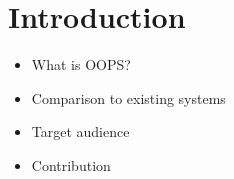\section{Introduction}

\begin{itemize}
\item{What is OOPS?}
\item{Comparison to existing systems}
\item{Target audience}
\item{Contribution}
\end{itemize}
